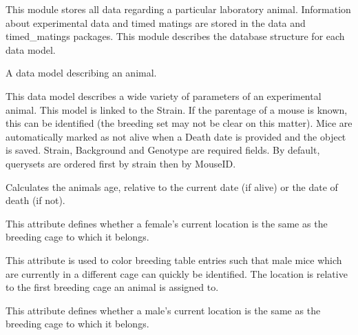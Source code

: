 \documentclass[letterpaper,10pt,english]{sphinxmanual}
\begin{document}
This module stores all data regarding a particular laboratory animal.  Information about experimental data and timed matings are stored in the data and timed\_matings packages.  This module describes the database structure for each data model.

\begin{fulllineitems}
\label{animals:mousedb.animal.models.Animal}
A data model describing an animal.

This data model describes a wide variety of parameters of an experimental animal.  This model is linked to the Strain.  If the parentage of a mouse is known, this can be identified (the breeding set may not be clear on this matter). Mice are automatically marked as not alive when a Death date is provided and the object is saved.  Strain, Background and Genotype are required fields.  By default, querysets are ordered first by strain then by MouseID.

\begin{fulllineitems}
\label{animals:mousedb.animal.models.Animal.age}
Calculates the animals age, relative to the current date (if alive) or the date of death (if not).

\end{fulllineitems}


\begin{fulllineitems}
\label{animals:mousedb.animal.models.Animal.breeding_female_location_type}
This attribute defines whether a female's current location is the same as the breeding cage to which it belongs.

This attribute is used to color breeding table entries such that male mice which are currently in a different cage can quickly be identified.
The location is relative to the first breeding cage an animal is assigned to.

\end{fulllineitems}


\begin{fulllineitems}
\label{animals:mousedb.animal.models.Animal.breeding_male_location_type}
This attribute defines whether a male's current location is the same as the breeding cage to which it belongs.


\end{fulllineitems}
\end{fulllineitems}
\end{document}
